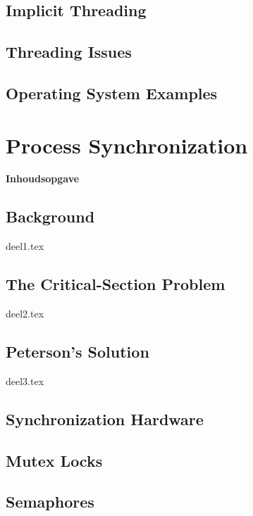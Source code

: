 \documentclass[a4paper,11pt]{report}
\newcommand\PartialTocChapter{%
\startcontents[chapters]\vbox{\bf\Large Inhoudsopgave }
\printcontents[chapters]{}{1}{\setcounter{tocdepth}{1}}
\newpage
}%
\begin{document}
\section{Implicit Threading}
\section{Threading Issues}
\section{Operating System Examples}


\chapter{Process Synchronization}

%

\PartialTocChapter

\section{Background}
{deel1.tex}

\section{The Critical-Section Problem}
{deel2.tex}
\section{Peterson’s Solution}
{deel3.tex}
\section{Synchronization Hardware}
\section{Mutex Locks}
\section{Semaphores}
\end{document}
